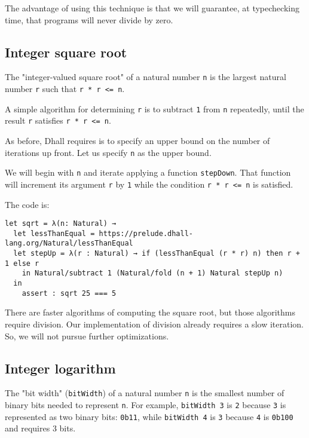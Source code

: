 The advantage of using this technique is that we will guarantee, at typechecking time, that programs will never divide by zero.


\subsection{Integer square root}


The "integer-valued square root" of a natural number \lstinline!n! is the largest natural number \lstinline!r! such that \lstinline!r * r <= n!. 


A simple algorithm for determining \lstinline!r! is to subtract \lstinline!1! from \lstinline!n! repeatedly, until the result \lstinline!r! satisfies \lstinline!r * r <= n!.


As before, Dhall requires is to specify an upper bound on the number of iterations up front.
Let us specify \lstinline!n! as the upper bound.


We will begin with \lstinline!n! and iterate applying a function \lstinline!stepDown!.
That function will increment its argument \lstinline!r! by \lstinline!1! while the condition \lstinline!r * r <= n! is satisfied. 


The code is:


\begin{lstlisting}[language=Dhall]
let sqrt = λ(n: Natural) →
  let lessThanEqual = https://prelude.dhall-lang.org/Natural/lessThanEqual
  let stepUp = λ(r : Natural) → if (lessThanEqual (r * r) n) then r + 1 else r 
    in Natural/subtract 1 (Natural/fold (n + 1) Natural stepUp n)
  in 
    assert : sqrt 25 === 5
\end{lstlisting}


There are faster algorithms of computing the square root, but those algorithms require division.
Our implementation of division already requires a slow iteration.
So, we will not pursue further optimizations.


\subsection{Integer logarithm}


The "bit width" (\lstinline!bitWidth!) of a natural number \lstinline!n! is the smallest number of binary bits needed to represent \lstinline!n!.
For example, \lstinline!bitWidth 3! is \lstinline!2! because \lstinline!3! is represented as two binary bits: \lstinline!0b11!, while \lstinline!bitWidth 4! is \lstinline!3! because \lstinline!4! is \lstinline!0b100! and requires 3 bits.


